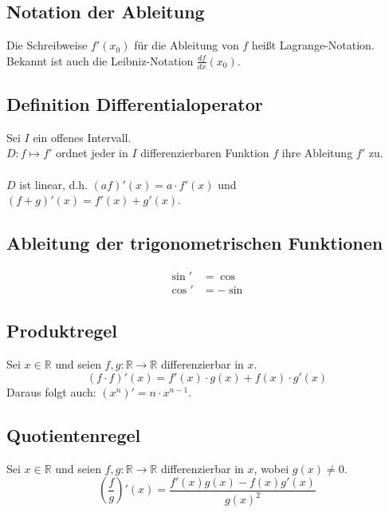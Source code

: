 \documentclass[halfparscip]{scrartcl}
\newcounter{subsection2}
\begin{document}
\subsection*{Notation der Ableitung}
Die Schreibweise $f'(x_0)$ für die Ableitung von $f$ heißt Lagrange-Notation. Bekannt ist auch die Leibniz-Notation $\frac{df}{dx}(x_0)$.

\subsection*{Definition Differentialoperator}
Sei $I$ ein offenes Intervall.\\
$D: f \mapsto f'$ ordnet jeder in $I$ differenzierbaren Funktion $f$ ihre Ableitung $f'$ zu.\\\\
$D$ ist linear, d.h. $(a f)'(x) = a \cdot f'(x)$ und $(f + g)'(x) = f'(x) + g'(x)$.

\subsection*{Ableitung der trigonometrischen Funktionen}
\begin{align*}
	\sin' &= \cos\\
	\cos' &= -\sin
\end{align*}

\addtocounter{subsection}{4}
\subsection{Produktregel}
Sei $x \in \mathbb{R}$ und seien $f, g: \mathbb{R} \rightarrow \mathbb{R}$ differenzierbar in $x$.\\
\begin{equation*}
	(f \cdot f)'(x) = f'(x)\cdot g(x) + f(x)\cdot g'(x)
\end{equation*}
Daraus folgt auch: $(x^n)' = n \cdot x^{n-1}$.

\subsection{Quotientenregel}
Sei $x \in \mathbb{R}$ und seien $f, g: \mathbb{R} \rightarrow \mathbb{R}$ differenzierbar in $x$, wobei $g(x) \neq 0$.\\
\begin{equation*}
	\left(\frac{f}{g}\right)'(x) = \frac{f'(x)g(x) - f(x)g'(x)}{g(x)^2}
\end{equation*}
\end{document}

